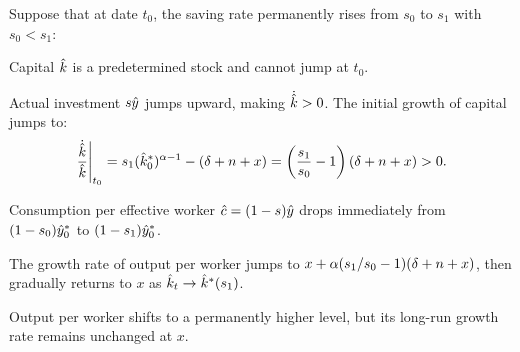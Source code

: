 \documentclass[11pt]{article}
\begin{document}
Suppose that at date $t_0$, the saving rate permanently rises from $s_0$ to $s_1$ with $s_0 < s_1$:
\begin{flatnum}
  \item Capital $\hat{k}$ is a predetermined stock and cannot jump at $t_0$.
  \item Actual investment $s\hat{y}$ jumps upward, making $\dot{\hat{k}} > 0$. The initial growth of capital jumps to:
  \[
  \left.\frac{\dot{\hat{k}}}{\hat{k}}\right|_{t_0} = s_1(\hat{k}_0^*)^{\alpha-1} - (\delta+n+x) = \left(\frac{s_1}{s_0} - 1\right)(\delta+n+x) > 0.
  \]
  \item Consumption per effective worker $\hat{c} = (1-s)\hat{y}$ drops immediately from $(1-s_0)\hat{y}_0^*$ to $(1-s_1)\hat{y}_0^*$.
  \item The growth rate of output per worker jumps to $x + \alpha(s_1/s_0 - 1)(\delta+n+x)$, then gradually returns to $x$ as $\hat{k}_t \to \hat{k}^*(s_1)$.
  \item Output per worker shifts to a permanently higher level, but its long-run growth rate remains unchanged at $x$.
\end{flatnum}
\end{document}
